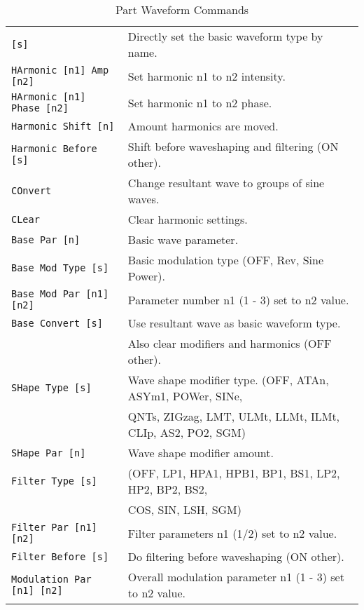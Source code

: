    \begin{table}[H]
      \centering
      \caption{Part Waveform Commands}
      \label{table:yoshimi_part_waveform_commands}
      \begin{tabular}{l l}
   \texttt{[s]} &
      Directly set the basic waveform type by name. \\
   \texttt{HArmonic [n1] Amp [n2]} &
      Set harmonic n1 to n2 intensity. \\
   \texttt{HArmonic [n1] Phase [n2]} &
      Set harmonic n1 to n2 phase. \\
   \texttt{Harmonic Shift [n]} &
      Amount harmonics are moved. \\
   \texttt{Harmonic Before [s]} &
      Shift before waveshaping and filtering (ON other). \\
   \texttt{COnvert} &
       Change resultant wave to groups of sine waves. \\
   \texttt{CLear} &
      Clear harmonic settings. \\
   \texttt{Base Par [n]} &
      Basic wave parameter. \\
   \texttt{Base Mod Type [s]} &
      Basic modulation type (OFF, Rev, Sine Power). \\
   \texttt{Base Mod Par [n1] [n2]} &
       Parameter number n1 (1 - 3) set to n2 value. \\
   \texttt{Base Convert [s]} &
       Use resultant wave as basic waveform type. \\
   \texttt{} &
      Also clear modifiers and harmonics (OFF other). \\
   \texttt{SHape Type [s] } &
      Wave shape modifier type. (OFF, ATAn, ASYm1, POWer, SINe,\\
   \texttt{} &
       QNTs, ZIGzag, LMT, ULMt, LLMt, ILMt, CLIp, AS2, PO2, SGM) \\
   \texttt{SHape Par [n]} &
      Wave shape modifier amount. \\
   \texttt{Filter Type [s]} &
      (OFF, LP1, HPA1, HPB1, BP1, BS1, LP2, HP2, BP2, BS2, \\
      \texttt{} &
      COS, SIN, LSH, SGM)\\
   \texttt{Filter Par [n1] [n2]} &
      Filter parameters  n1 (1/2) set to n2 value. \\
   \texttt{Filter Before [s]} &
      Do filtering before waveshaping (ON other). \\
   \texttt{Modulation Par [n1] [n2]} &
      Overall modulation parameter n1 (1 - 3) set to n2 value. \\

\end{tabular}
\end{table}
